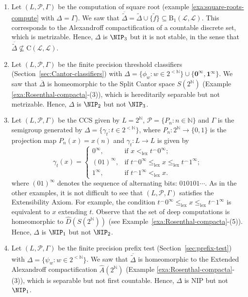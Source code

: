 \begin{example}\label{exa:NIP-levels}
\hfill
\begin{enumerate}
    \item Let $(L,\mathcal{P},\Gamma)$ be the computation of square root (example \ref{exa:square-roots-compute} with $\Delta=\Gamma$).
    We saw that $\overline{\tilde{\Delta}}=\tilde{\Delta}\cup\{\tilde{f}\}\subseteq \mathrm{B}_1(\mathcal{L},\mathcal{L})$.
    This corresponds to the Alexandroff compactification of a countable discrete set, which is metrizable. Hence, $\Delta$ is $\NIP_3$ but it is not stable, in the sense that $\overline{\tilde{\Delta}}\not\subseteq \mathrm{C}(\mathcal{L},\mathcal{L})$.

    \item Let $(L,\mathcal{P},\Gamma)$ be the finite precision threshold classifiers (Section~\ref{sec:Cantor-classifiers}) with $\Delta=\{\phi_w:w\in 2^{<\mathbb{N}}\}\cup\{\mathbf{0^\infty},\mathbf{1^\infty}\}$.
    We saw that $\overline{\Delta}$ is homeomorphic to the Split Cantor space $S(2^\mathbb{N})$ (Example \ref{exa:Rosenthal-compacta}-(3)), which is hereditarily separable but not metrizable.
    Hence, $\Delta$ is $\NIP_2$ but not $\NIP_3$.

    \item Let $(L,\mathcal{P},\Gamma)$ be the CCS given by $L=2^{\mathbb{N}}$, $\mathcal{P}=\{P_n:n\in\mathbb{N}\}$ and $\Gamma$ is the semigroup generated by $\Delta=\{\gamma_t:t\in 2^{<\mathbb{N}}\}$, where $P_n\colon 2^\mathbb{N}\to\{0,1\}$ is the projection map $P_n(x)=x(n)$ and $\gamma_t\colon L\to L$ is given by
    \[
	\gamma_t(x)=\begin{cases}
        0^\infty, & \text{if }x<_{\text{lex}}t^\frown0^\infty;\\
        (01)^\infty, & \text{if }t^\frown0^\infty\leq_{\text{lex}} x \leq_{\text{lex}} t^\frown1^\infty;\\
        1^\infty, & \text{if }t^\frown1^\infty<_{\text{lex}}x.
    \end{cases}
    \]
    where $(01)^\infty$ denotes the sequence of alternating bits: $010101\cdots$. 
    As in the other examples, it is not difficult to see that $(L,\mathcal{P},\Gamma)$ satisfies the Extensibility Axiom.
    For example, the condition $t^\frown0^\infty\leq_{\text{lex}} x \leq_{\text{lex}} t^\frown1^\infty$ is equivalent to $x$ extending $t$.
    Observe that the set of deep computations is homeomorphic to $\hat{D}(S(2^{\mathbb{N}}))$ (see Example~\ref{exa:Rosenthal-compacta}-(5)).
    Hence, $\Delta$  is $\NIP_1$ but not $\NIP_2$.

    \item Let $(L,\mathcal{P},\Gamma)$ be the finite precision prefix test (Section~\ref{sec:prefix-test}) with $\Delta=\{\psi_w:w\in 2^{<\mathbb{N}}\}$.
    We saw that $\overline{\tilde{\Delta}}$ is homeomorphic to the Extended Alexandroff compactification $\hat{A}(2^\mathbb{N})$ (Example \ref{exa:Rosenthal-compacta}-(3)), which is separable but not first countable.
    Hence, $\Delta$ is NIP but not $\NIP_1$.
\end{enumerate}
\end{example}

